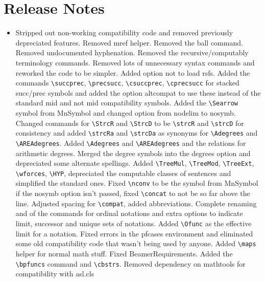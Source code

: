 \documentclass[leqno,11pt]{amsart}
\begin{document}
\section{Release Notes}


\begin{itemize}
	\item[4.0] Stripped out non-working compatibility code and removed previously depreciated features.  Removed mref helper.  Removed the ball command.  Removed undocumented hyphenation.  Removed the recursive/computably terminology commands.   Removed lots of unnecessary syntax commands and reworked the code to be simpler.  Added option not to load rsfs.  Added the commands \verb=\succprec=, \verb=\precsucc=, \verb=\csuccprec=, \verb=\cprecsucc= for stacked succ/prec symbols and added the option altcompat to use these instead of the standard mid and not mid compatibility symbols.  Added the \verb=\Searrow= symbol from MnSymbol and changed option from nodelim to nosymb.
	Changed commands for \verb=\StrcR= and \verb=\StrcD= to be \verb=\strcR= and \verb=\strcD= for consistency and added \verb=\strcRa= and \verb=\strcDa= as synonyms for \verb=\Adegrees= and \verb=\AREAdegrees=.  Added \verb=\Adegrees= and \verb=\AREAdegrees= and the relations for arithmetic degrees.  Merged the degree symbols into the degrees option and depreciated some alternate spellings.  Added \verb=\TreeMul=, \verb=\TreeMod=, \verb=\TreeExt=, \verb=\wforces=, \verb=\HYP=, depreciated the computable classes of sentences and simplified the standard ones.  Fixed \verb=\nconv= to be the symbol from MnSymbol if the nosymb option isn't passed, fixed \verb=\concat= to not be so far above the line.  Adjusted spacing for \verb=\compat=, added abbreviations.  Complete renaming and of the commands for ordinal notations and extra options to indicate limit, successor and unique sets of notations.  Added \verb=\Ofunc= as the effective limit for a notation.  Fixed errors in the pfcases environment and eliminated some old compatibility code that wasn't being used by anyone.  Added \verb=\maps= helper for normal math stuff.  Fixed BeamerRequirements.  Added the \verb=\bpfuncs= command and \verb=\cbstrs=.  Removed dependency on mathtools for compatibility with asl.cls


\end{itemize}
\end{document}
